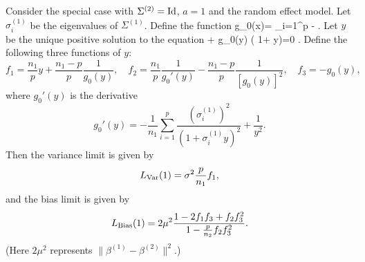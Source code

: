 Consider the special case with $\Sigma^{(2)}=\operatorname{Id}$, $a=1$ and the random effect model. Let $\sigma_i^{(1)}$ be the eigenvalues of $\Sigma^{(1)}$. Define the function 
\be\label{g1new} g_0(x)= \sum_{i=1}^p  - .\ee
Let $y$ be the unique positive solution to the equation 
\be\nonumber
{} + g_0(y) \cdot \left( 1+    y\right)=0 .
\ee
Define the following three functions of $y$:
$$f_1= \frac{n_1}{p}y + \frac{n_1-p}{p}\frac1{g_0(y)},\quad f_2= \frac{n_1}{p}\frac{1}{g_0'(y)}- \frac{n_1-p}{p}\frac1{[g_0(y)]^2},\quad f_3= - g_0(y),$$
where $g_0'(y)$ is the derivative
$$ g_0'(y)=  -\frac{1}{n_1}\sum_{i=1}^p \frac{(\sigma_i^{(1)})^2}{(1+ \sigma_i^{(1)} y)^2} +\frac{1}{y^2}. $$
Then the variance limit is given by
$$ L_{\operatorname{Var}}(1)=\sigma^2 \frac{p}{n_1}f_1,$$
and the bias limit is given by 
$$ L_{\textup{Bias}}(1)=2\mu^2 \frac{1 - 2f_1 f_3  +f_2 f_3^2  }{ 1 - \frac{p}{n_2}f_2 f_3^2 }.$$
(Here $2\mu^2$ represents $\|\beta^{(1)}-\beta^{(2)}\|^2$.)
